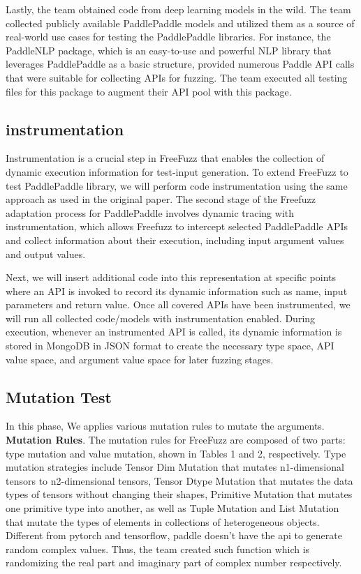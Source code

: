 \documentclass[sigconf]{acmart}
\begin{document}
  Lastly, the team obtained code from deep learning models in the wild. 
  The team collected publicly available PaddlePaddle models and utilized them as a source of real-world use cases for testing the PaddlePaddle libraries. 
  For instance, the PaddleNLP package, which is an easy-to-use and powerful NLP library that leverages PaddlePaddle as a basic structure, provided numerous Paddle API calls that were suitable for collecting APIs for fuzzing. 
  The team executed all testing files for this package to augment their API pool with this package.
    
  \subsection{instrumentation}
  

  Instrumentation is a crucial step in FreeFuzz that enables the collection of dynamic execution information for test-input generation. 
  To extend FreeFuzz to test PaddlePaddle library, we will perform code instrumentation using the same approach as used in the original paper.
  The second stage of the Freefuzz adaptation process for PaddlePaddle involves dynamic tracing with instrumentation, 
  which allows Freefuzz to intercept selected PaddlePaddle APIs and collect information about their execution, 
  including input argument values and output values. 

  Next, we will insert additional code into this representation at specific points where an API is invoked to record its dynamic information such as name, input parameters and return value.
  Once all covered APIs have been instrumented, we will run all collected code/models with instrumentation enabled. 
  During execution, whenever an instrumented API is called, its dynamic information is stored in MongoDB in JSON format to create the necessary type space, 
  API value space, and argument value space for later fuzzing stages.


  \subsection{Mutation Test}

  In this phase, We applies various mutation rules to mutate the arguments.\cite{w1}
  \newline \textbf{Mutation Rules}. The mutation rules for FreeFuzz are composed
  of two parts: type mutation and value mutation, shown in Tables 1
  and 2, respectively. Type mutation strategies include Tensor Dim
  Mutation that mutates n1-dimensional tensors to n2-dimensional
  tensors, Tensor Dtype Mutation that mutates the data types of tensors without changing their shapes, Primitive Mutation that mutates
  one primitive type into another, as well as Tuple Mutation and List
  Mutation that mutate the types of elements in collections of heterogeneous objects.\cite{w1}
  \newline Different from pytorch and tensorflow, paddle doesn't have the api to generate random complex values. Thus, the team
  created such function which is randomizing the real part and imaginary part of complex number respectively.
 
\end{document}
